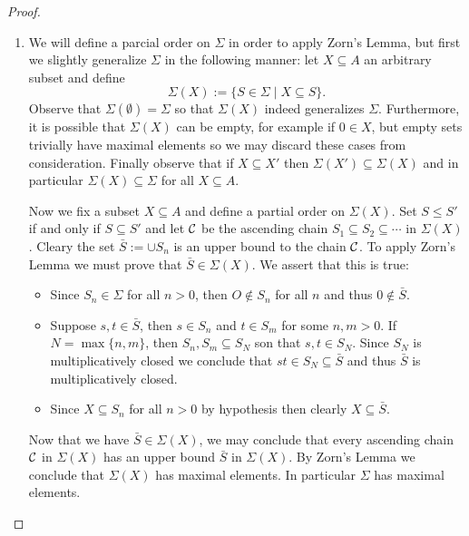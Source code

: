 \begin{proof}


\begin{enumerate}

	\item We will define a parcial order on $\Sigma$ in order to apply Zorn's Lemma, but first we slightly generalize $\Sigma$ in the following manner: let $X\subseteq A$ an arbitrary subset and define
	\[
		\Sigma(X):=\{S\in\Sigma\mid X\subseteq S\}.
	\]
Observe that $\Sigma(\emptyset)=\Sigma$ so that $\Sigma(X)$ indeed generalizes $\Sigma$. Furthermore, it is possible that $\Sigma(X)$ can be empty, for example if $0\in X$, but empty sets trivially have maximal elements so we may discard these cases from consideration. Finally observe that if $X\subseteq X'$ then $\Sigma(X')\subseteq \Sigma(X)$ and in particular $\Sigma(X)\subseteq\Sigma$ for all $X\subseteq A$.
	
	Now we fix a subset $X\subseteq A$ and define a partial order on $\Sigma(X)$. Set $S\leq S'$ if and only if $S\subseteq S'$ and let $\mathcal{C}$ be the ascending chain $S_1\subseteq S_2\subseteq \cdots$ in $\Sigma(X)$. Cleary the set $\bar{S}:=\cup S_n$ is an upper bound to the chain $\mathcal{C}$. To apply Zorn's Lemma we must prove that $\bar{S}\in\Sigma(X)$. We assert that this is true:
	\begin{itemize}
		\item Since $S_n\in\Sigma$ for all $n>0$, then $O\not\in S_n$ for all $n$ and thus $0\not\in \bar{S}$.
		\item Suppose $s,t\in\bar{S}$, then $s\in S_n$ and $t\in S_m$ for some $n,m>0$. If $N=\max\{n,m\}$, then $S_n,S_m\subseteq S_N$ son that $s,t\in S_N$. Since $S_N$ is multiplicatively closed we conclude that $st\in S_N\subseteq\bar{S}$ and thus $\bar{S}$ is multiplicatively closed.
		\item Since $X\subseteq S_n$ for all $n>0$ by hypothesis then clearly $X\subseteq\bar{S}$.
	\end{itemize}
	Now that we have $\bar{S}\in\Sigma(X)$, we may conclude that every ascending chain $\mathcal{C}$ in $\Sigma(X)$ has an upper bound $\bar{S}$ in $\Sigma(X)$. By Zorn's Lemma we conclude that $\Sigma(X)$ has maximal elements.	In particular $\Sigma$ has maximal elements.
	

\end{enumerate}
\end{proof}
